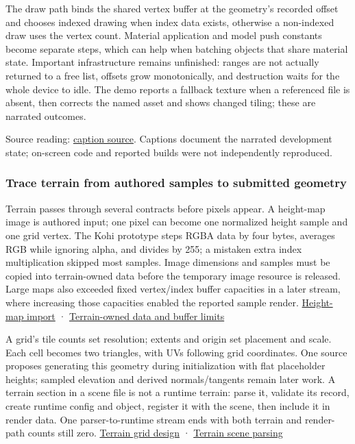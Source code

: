 The draw path binds the shared vertex buffer at the geometry's recorded offset and chooses indexed drawing when index data exists, otherwise a non-indexed draw uses the vertex count. Material application and model push constants become separate steps, which can help when batching objects that share material state. Important infrastructure remains unfinished: ranges are not actually returned to a free list, offsets grow monotonically, and destruction waits for the whole device to idle. The demo reports a fallback texture when a referenced file is absent, then corrects the named asset and shows changed tiling; these are narrated outcomes.

Source reading: \href{https://www.youtube.com/watch?v=tHW0T6a0h5E}{caption source}. Captions document the narrated development state; on-screen code and reported builds were not independently reproduced.

\subsubsection{Trace terrain from authored samples to submitted geometry}\label{06-engine-ii-ch031-trace-terrain-from-authored-samples-to-submitted-geometry}

Terrain passes through several contracts before pixels appear. A height-map image is authored input; one pixel can become one normalized height sample and one grid vertex. The Kohi prototype steps RGBA data by four bytes, averages RGB while ignoring alpha, and divides by 255; a mistaken extra index multiplication skipped most samples. Image dimensions and samples must be copied into terrain-owned data before the temporary image resource is released. Large maps also exceeded fixed vertex/index buffer capacities in a later stream, where increasing those capacities enabled the reported sample render. \href{https://www.youtube.com/watch?v=hSvbfxOPCZ0}{Height-map import} · \href{https://www.youtube.com/watch?v=vLzvpFaX50A}{Terrain-owned data and buffer limits}

A grid's tile counts set resolution; extents and origin set placement and scale. Each cell becomes two triangles, with UVs following grid coordinates. One source proposes generating this geometry during initialization with flat placeholder heights; sampled elevation and derived normals/tangents remain later work. A terrain section in a scene file is not a runtime terrain: parse it, validate its record, create runtime config and object, register it with the scene, then include it in render data. One parser-to-runtime stream ends with both terrain and render-path counts still zero. \href{https://www.youtube.com/watch?v=unypFSvg7gI}{Terrain grid design} · \href{https://www.youtube.com/watch?v=o3VS8tbwaRI}{Terrain scene parsing}

